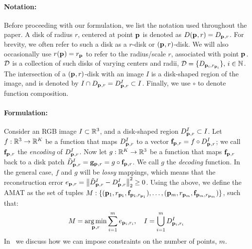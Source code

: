 \documentclass[10pt,twocolumn,letterpaper]{article}
\begin{document}
\paragraph{Notation:} Before proceeding with our formulation, we list the notation used throughout the paper.
A disk of radius $r$, centered at point $\mathbf{p}_{}$ is denoted as $D(\mathbf{p}_{},r)=D_{\mathbf{p}_{},r}$. 
For brevity, we often refer to such a disk as a $r$-disk or $(\mathbf{p}_{},r)$-disk.
We will also occasionally use $r(\mathbf{p}_{}) = r_{\mathbf{p}_{}}$ to refer to the radius/scale $r$, associated with point $\mathbf{p}_{}$.
$\mathcal{D}$ is a collection of such disks of varying centers and radii, $\mathcal{D}=\{ D_{\mathbf{p}_{i},r_{\mathbf{p}_{i}}} \},\, i\in\mathbb{N}$.
The intersection of a $(\mathbf{p}_{},r)$-disk with an image $I$ is a disk-shaped region of the image, and is denoted by 
$I \cap D_{\mathbf{p}_{},r}=D_{\mathbf{p}_{},r}^I \subset I$. Finally, we use $\circ$ to denote function composition.

\paragraph{Formulation:} Consider an RGB image $I\subset\mathbb{R}^3$, and a disk-shaped region $D_{\mathbf{p}_{},r}^I \subset I$.
Let $f:\mathbb{R}^3 \rightarrow \mathbb{R}^K$ be a function that maps $D_{\mathbf{p}_{},r}^I$ to a vector  $\mathbf{f}_{\mathbf{p}_{},r}=f\circ D_{\mathbf{p}_{},r}^I$; 
we call $\mathbf{f}_{\mathbf{p}_{},r}$ the \emph{encoding} of $D_{\mathbf{p}_{},r}^I$. 
Now let $g:\mathbb{R}^K \rightarrow \mathbb{R}^3$ be a function that maps $\mathbf{f}_{\mathbf{p}_{},r}$ back to a disk patch 
$\tilde{D}_{\mathbf{p}_{},r}^I = \mathbf{g}_{\mathbf{p}_{},r} = g \circ \mathbf{f}_{\mathbf{p}_{},r}$. We call $g$ the \emph{decoding} function.
In the general case, $f$ and $g$ will be \emph{lossy} mappings, which means that the reconstruction error 
$e_{\mathbf{p}_{},r} = \left \lVert  \tilde{D}_{\mathbf{p}_{},r}^I - D_{\mathbf{p}_{},r}^I \right \rVert_2^2 \geq 0$. 
Using the above, we define the AMAT as the set of tuples 
$M:\{ ( \mathbf{p}_{1},r_{\mathbf{p}_{1}}, \mathbf{f}_{\mathbf{p}_{1},r_{\mathbf{p}_{1}}} ), \ldots, ( \mathbf{p}_{m},r_{\mathbf{p}_{m}}, \mathbf{f}_{\mathbf{p}_{m},r_{\mathbf{p}_{m}}} ) \}$, such that:
\begin{equation}
M = \operatorname*{arg\,min}_{\mathbf{p}_{},r}{\sum_{i=1}^m e_{\mathbf{p}_{i},r_i}},\quad I=\bigcup_{i=1}^m D_{\mathbf{p}_{i},r_i}^I 
\label{eq:minimization}
\end{equation}
In~ we discuss how we can impose constraints on the number of points, $m$.
\end{document}
